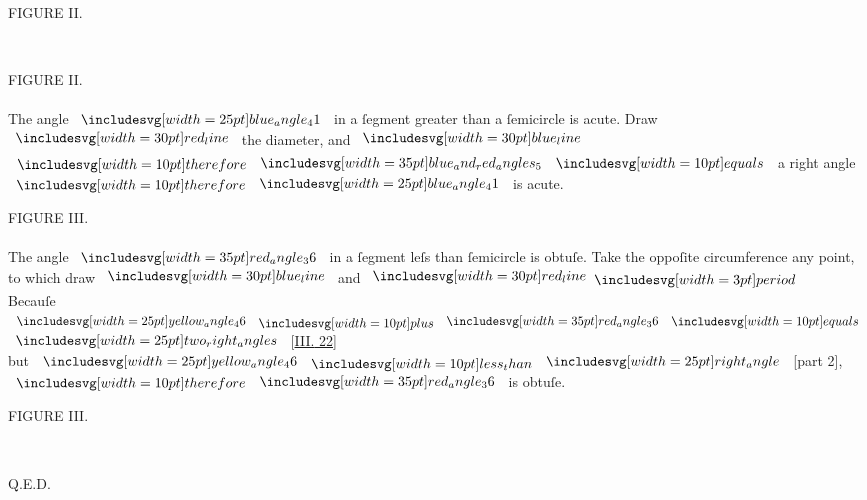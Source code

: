 \documentclass[12pt,preview]{standalone}
\begin{document}
\vspace{\baselineskip}

\begin{minipage}[t]{0.43\textwidth}
    \vspace{0pt}
    \begin{center}
        FIGURE II.
    \end{center}
    \hfill\\
    
\end{minipage}%
\hfill
\begin{minipage}[t]{0.54\textwidth}
    \vspace{0pt}

    \begin{center}
        FIGURE II.\\
        \hfill\\
        The angle $\img{blue_angle_41}$ in a ſegment greater than a ſemicircle is acute.  Draw $\redline$ the diameter, and $\blueline$\\
        $\btherefore \img[0][0][35]{blue_and_red_angles_5} \bequals$ a right angle\\ $\btherefore \img{blue_angle_41}$ is acute.
    \end{center}
\end{minipage}%

\hfill

\begin{minipage}[t]{0.54\textwidth}
    \vspace{0pt}

    \begin{center}
        FIGURE III.\\
        \hfill\\
        The angle $\img[0][0][35]{red_angle_36}$ in a ſegment leſs than ſemicircle is obtuſe.  Take the oppoſite circumference any point, to which draw $\blueline$ and $\redline \bperiod$
        \hfill\\
        Becauſe $\img{yellow_angle_46} \bplus \img[0][0][35]{red_angle_36} \bequals$\\
        $\img{two_right_angles}$ [\hyperref[book3pr22]{\textsc{III.} 22}]\\
        but $\img{yellow_angle_46} \blt \img{right_angle}$ [part 2], $\btherefore \img[0][0][35]{red_angle_36}$ is obtuſe.
    \end{center}

\end{minipage}%
\hfill
\begin{minipage}[t]{0.43\textwidth}
    \vspace{0pt}
    \begin{center}
        FIGURE III.
    \end{center}
    \hfill\\
    
\end{minipage}%

\hfill

\hfill Q.E.D.
\end{document}

